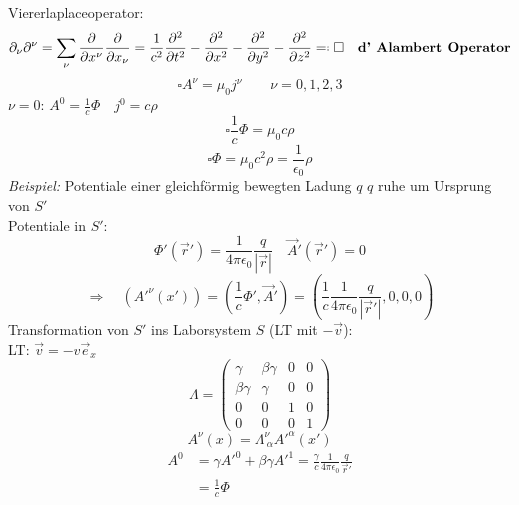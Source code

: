 Viererlaplaceoperator:
\begin{equation*}
\partial_{\nu} \partial^{\nu} = \sum_{\nu} \prt{}{x^{\nu}} \prt{}{x_{\nu}} = \frac{1}{c^2} \prt{^2}{t^2} - \prt{^2}{x^2} - \prt{^2}{y^2} - \prt{^2}{z^2} \eqdef \square \quad \tx{\textbf{d' Alambert Operator}}
\end{equation*}
\begin{equation*}
\square A^{\nu} = \mu_0 j^{\nu} \qquad \nu = 0, 1, 2, 3
\end{equation*}
$ \nu = 0 $: $ A^{0} = \frac{1}{c} \Phi \quad j^{0} = c \rho $
\begin{equation*}
\square \frac{1}{c} \Phi = \mu_0 c \rho
\end{equation*}
\begin{equation*}
\square \Phi = \mu_0 c^2 \rho = \frac{1}{\epsilon_0} \rho
\end{equation*}
\emph{Beispiel:} Potentiale einer gleichförmig bewegten Ladung $ q $
%
%
%
%
%
%
$ q $ ruhe um Ursprung von $ S' $\\[5pt]
Potentiale in $ S' $:
\begin{equation*}
\Phi'(\vec{r}') = \frac{1}{4 \pi \epsilon_0} \frac{q}{|\vec{r}|} \quad \vec{A}'(\vec{r}') = 0
\end{equation*}
\begin{equation*}
\Rightarrow \quad \left(A'^{\nu} (x')\right) = \left(\frac{1}{c} \Phi', \vec{A}'\right) = \left(\frac{1}{c} \frac{1}{4 \pi \epsilon_0} \frac{q}{|\vec{r}'|}, 0, 0, 0\right)
\end{equation*}
Transformation von $ S' $  ins Laborsystem $ S $ (LT mit $ - \vec{v} $):\\[5pt]
LT: $ \vec{v} = -v \vec{e}_x $
\begin{equation*}
\Lambda = \begin{pmatrix}
\gamma & \beta \gamma & 0 & 0 \\
\beta \gamma & \gamma & 0 & 0 \\
0 & 0 & 1 & 0 \\
0 & 0 & 0 & 1
\end{pmatrix}
\end{equation*}
\begin{equation*}
A^{\nu} (x) = \Lambda^{\nu}_{\ \alpha} A'^{\alpha} (x')
\end{equation*}
\begin{align*}
A^{0} &= \gamma A'^{0} + \beta \gamma A'^{1} = \frac{\gamma}{c} \frac{1}{4 \pi \epsilon_0} \frac{q}{\vec{r}'}\\
&= \frac{1}{c} \Phi
\end{align*}
